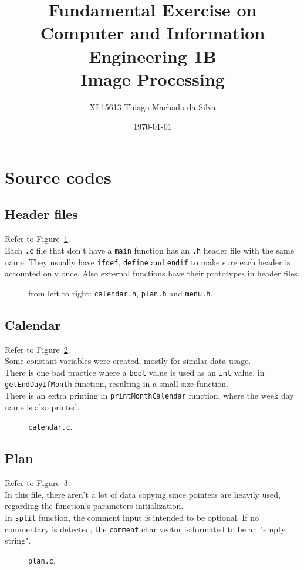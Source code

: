\documentclass{article}
\title{Fundamental Exercise on Computer and Information Engineering 1B \\ Image Processing}
\author{XL15613   Thiago Machado da Silva}
\date{\today}
\begin{document}
\maketitle

\section*{Source codes}
\subsection*{Header files}
Refer to Figure~\ref{fig:headers}. \\
Each {\tt .c} file that don't have a {\tt main} function has an {\tt .h} header file with the same name. They usually have {\tt ifdef}, {\tt define} and {\tt endif} to make sure each header is accounted only once. Also external functions have their prototypes in header files. \\
\begin{figure}[h]
  \centering
  \caption{from left to right: {\tt calendar.h}, {\tt plan.h} and {\tt menu.h}.}
  \label{fig:headers}
\end{figure}

\subsection*{Calendar}
Refer to Figure~\ref{fig:calendar}. \\
Some constant variables were created, mostly for similar data usage. \\
There is one bad practice where a {\tt bool} value is used as an {\tt int} value, in {\tt getEndDayIfMonth} function, resulting in a small size function. \\
There is an extra printing in {\tt printMonthCalendar} function, where the week day name is also printed. \\
\begin{figure}[h]
  \centering
  \caption{{\tt calendar.c}.}
  \label{fig:calendar}
\end{figure}

\subsection*{Plan}
Refer to Figure~\ref{fig:plan}. \\
In this file, there aren't a lot of data copying since pointers are heavily used, regarding the function's parameters initialization. \\
In {\tt split} function, the comment input is intended to be optional. If no commentary is detected, the {\tt comment} char vector is formated to be an "empty string". \\
\begin{figure}[h]
  \centering
  \caption{{\tt plan.c}.}
  \label{fig:plan}
\end{figure}
\end{document}
